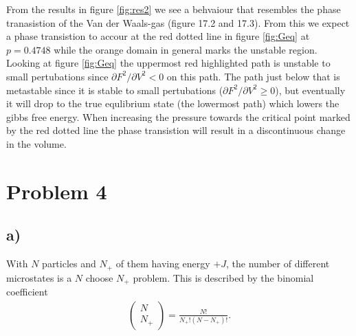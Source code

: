 \documentclass[reprint, amsmath, amssymb, aps, onecolumn]{revtex4-2}
\begin{document}
From the results in figure \ref{fig:res2} we see a behvaiour that resembles the phase tranasistion of the Van der Waals-gas \cite{Svendsen}(figure 17.2 and 17.3). From this we expect a phase transistion to accour at the red dotted line in figure \ref{fig:Geq} at $p = 0.4748$ while the orange domain in general marks the unstable region. Looking at figure \ref{fig:Geq} the uppermost red highlighted path is unstable to small pertubations since $\partial F^2/\partial V^2 < 0$ on this path. The path just below that is metastable since it is stable to small pertubations ($\partial F^2/\partial V^2 \ge 0$), but eventually it will drop to the true equlibrium state (the lowermost path) which lowers the gibbs free energy. When increasing the pressure towards the critical point marked by the red dotted line the phase transistion will result in a discontinuous change in the volume.
%
%
\section*{Problem 4}
\subsection*{a)}
\noindent With $N$ particles and $N_+$ of them having energy $+J$, the number of different microstates is a $N$ choose $N_+$ problem. This is described by the binomial coefficient
\begin{align}
  \begin{pmatrix} N \\ N_+ \end{pmatrix} = \frac{N!}{N_+!(N-N_+)!}. \label{eq:omega}
\end{align}
%
%
\end{document}
